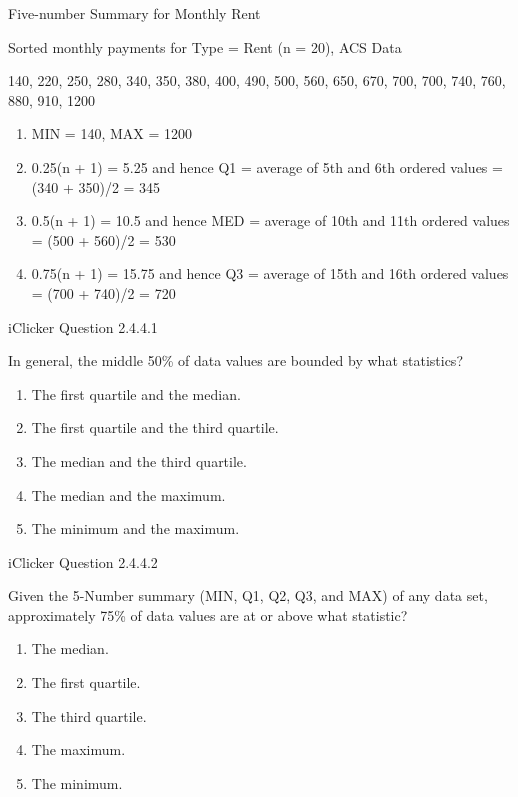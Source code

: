 \documentclass[14pt]{beamer}\usepackage[]{graphicx}\usepackage[]{color}
\begin{document}
\begin{frame}[fragile]{Five-number Summary for Monthly Rent}

{\small{
Sorted monthly payments for Type = Rent (n = 20), ACS Data}}

\vspace{3mm}

140, 220, 250, 280, 340, 350, 380, 400, 490, 500, 560, 650, 670, 700, 700, 740, 760, 880, 910, 1200

{\small{
\begin{enumerate}
\item<1-> MIN = 140, MAX = 1200
\item<2-> 0.25(n + 1) = 5.25 and hence Q1 = average of 5th and 6th  ordered values = (340 + 350)/2 = 345
\item<3-> 0.5(n + 1) = 10.5 and hence MED = average of 10th and 11th  ordered values = (500 + 560)/2 = 530
\item<4-> 0.75(n + 1) = 15.75 and hence Q3 = average of 15th and 16th  ordered values = (700 + 740)/2 = 720
\end{enumerate}
}}
\end{frame}

\begin{frame}[fragile]{iClicker Question 2.4.4.1}

 In general, the middle 50\% of data values are bounded by what  statistics?
\begin{enumerate}

\item The first quartile and the median.
\item The first quartile and the third quartile.
\item The median and the third quartile.
\item The median and the maximum.
\item The minimum and the maximum.
\end{enumerate}
\end{frame}

\begin{frame}[fragile]{iClicker Question 2.4.4.2}

Given the 5-Number summary (MIN, Q1, Q2, Q3, and MAX) of any  data set, approximately 75\% of data values are at or above what  statistic?

\begin{enumerate}
\item The median.
\item The first quartile.
\item The third quartile.
\item The maximum.
\item The minimum.
\end{enumerate}
\end{frame}
\end{document}
